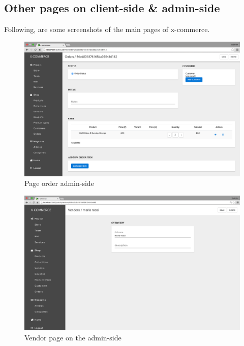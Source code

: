 \subsection{Other pages on client-side \& admin-side}
Following, are some screenshots of the main pages of x-commerce.
\newline
\begin{figure}[htb]
\centering
\includegraphics[width=1.0\linewidth]{images/chapter4/page-order-all.png}\hfill
\caption[page order admin-side]{Page order admin-side}
\label{fig:page_order_admin}
\end{figure}
\begin{figure}[htb]
\centering
\includegraphics[width=1.0\linewidth]{images/chapter4/page-vendor-all.png}\hfill
\caption[Vendor page on the  admin-side]{Vendor page on the admin-side}
\label{fig:page_vendor_admin}
\end{figure}
